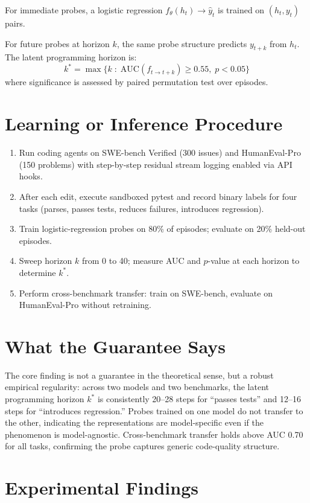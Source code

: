 \documentclass[10pt,twocolumn]{article}
\begin{document}
For immediate probes, a logistic regression $f_\theta(h_t) \to \hat{y}_t$
is trained on $(h_t, y_t)$ pairs.

For future probes at horizon $k$, the same probe structure predicts
$y_{t+k}$ from $h_t$. The latent programming horizon is:
\[
k^* = \max\bigl\{k\;:\;
  \mathrm{AUC}(f_{t \to t+k}) \geq 0.55,\;p < 0.05\bigr\}
\]
where significance is assessed by paired permutation test over episodes.

\section{Learning or Inference Procedure}

\begin{enumerate}[itemsep=2pt,parsep=0pt]
  \item Run coding agents on SWE-bench Verified (300 issues) and
    HumanEval-Pro (150 problems) with step-by-step residual stream
    logging enabled via API hooks.
  \item After each edit, execute sandboxed pytest and record binary
    labels for four tasks (parses, passes tests, reduces failures,
    introduces regression).
  \item Train logistic-regression probes on 80\% of episodes;
    evaluate on 20\% held-out episodes.
  \item Sweep horizon $k$ from 0 to 40; measure AUC and $p$-value
    at each horizon to determine $k^*$.
  \item Perform cross-benchmark transfer: train on SWE-bench,
    evaluate on HumanEval-Pro without retraining.
\end{enumerate}

\section{What the Guarantee Says}

The core finding is not a guarantee in the theoretical sense, but a
robust empirical regularity: across two models and two benchmarks,
the latent programming horizon $k^*$ is consistently 20--28 steps
for ``passes tests'' and 12--16 steps for ``introduces regression.''
Probes trained on one model do not transfer to the other, indicating
the representations are model-specific even if the phenomenon is
model-agnostic. Cross-benchmark transfer holds above AUC 0.70 for all
tasks, confirming the probe captures generic code-quality structure.

\section{Experimental Findings}
\end{document}
